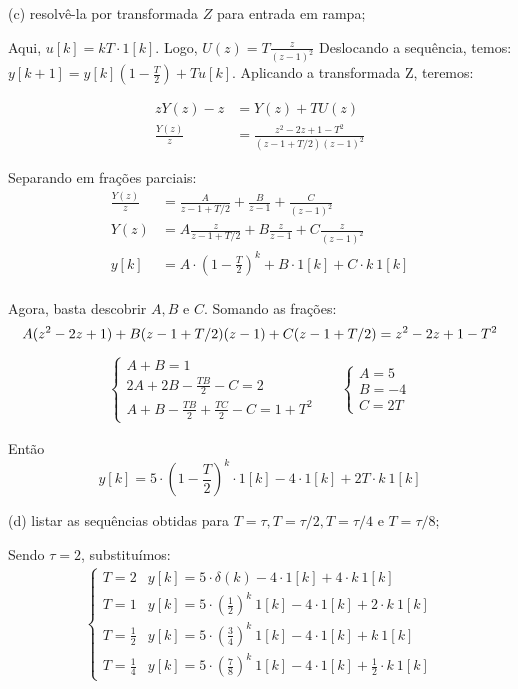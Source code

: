 \documentclass[10pt]{article}
\begin{document}
(c) resolvê-la por transformada $Z$ para entrada em rampa;

Aqui, $u[k] = kT \cdot 1[k]$. Logo, $U(z) = T\frac{z}{(z - 1)^2}$
Deslocando a sequência, temos: $y[k + 1] = y[k] \left(1 - \frac{T}{2}\right) + Tu[k]$. Aplicando a transformada Z, teremos:

\begin{align*}
    zY(z) - z &= Y(z) + T U(z)\\
    \frac{Y(z)}{z} &= \frac{z^2 -2z + 1 - T^2}{(z - 1 + T/2)(z-1)^2}
\end{align*}

Separando em frações parciais:
\begin{align*}
    \frac{Y(z)}{z} &= \frac{A}{z - 1 + T/2} + \frac{B}{z - 1} + \frac{C}{(z - 1)^2}\\
    Y(z) &= A\frac{z}{z - 1 + T/2} + B\frac{z}{z - 1} + C\frac{z}{(z - 1)^2}\\
    y[k] &= A \cdot \left(1 - \frac{T}{2}\right)^k + B \cdot 1[k] + C \cdot k\ 1[k]\\
\end{align*}

Agora, basta descobrir $A, B$ e $C$. Somando as frações:
\[A (z^2 - 2z + 1) + B (z - 1 + T/2)(z - 1) + C (z - 1 + T/2) = z^2 -2z + 1 - T^2\\\]
\begin{align*}
    \begin{cases}
        A + B = 1\\
        2A + 2B - \frac{TB}{2} - C = 2\\
        A + B - \frac{TB}{2} + \frac{TC}{2} - C = 1 + T^2
    \end{cases}
    & &
    \begin{cases}
        A = 5\\
        B = -4\\
        C = 2T
    \end{cases}
\end{align*}

Então
\[y[k] = 5 \cdot \left(1 - \frac{T}{2}\right)^k \cdot 1[k] - 4 \cdot 1[k] + 2T \cdot k\ 1[k]\]

(d) listar as sequências obtidas para $T = \tau, T = \tau / 2, T = \tau / 4 \text{ e } T = \tau / 8$;

Sendo $\tau = 2$, substituímos:
\begin{align*}
    \begin{cases}
        T = 2 & y[k] = 5 \cdot \delta(k) - 4 \cdot 1[k] + 4 \cdot k\ 1[k]\\
        T = 1 & y[k] = 5 \cdot \left(\frac{1}{2}\right)^k \ 1[k] - 4 \cdot 1[k] + 2 \cdot k\ 1[k]\\
        T = \frac{1}{2} & y[k] = 5 \cdot \left(\frac{3}{4}\right)^k \ 1[k] - 4 \cdot 1[k] + k\ 1[k]\\
        T = \frac{1}{4} & y[k] = 5 \cdot \left(\frac{7}{8}\right)^k \ 1[k] - 4 \cdot 1[k] + \frac{1}{2} \cdot k\ 1[k]
    \end{cases}
\end{align*}
\end{document}

